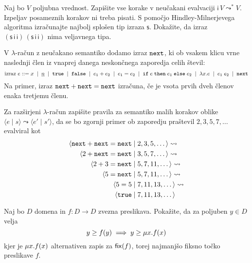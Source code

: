 \documentclass[arhiv]{../izpit}
\begin{document}
\podnaloga[\tocke{5}] Naj bo $V$ poljubna vrednost. Zapišite vse korake v neučakani evalvaciji $\mathsf{i} \, V \leadsto^* V$. Izpeljav posameznih korakov ni treba pisati.
\podnaloga[\tocke{10}] S pomočjo Hindley-Milnerjevega algoritma izračunajte najbolj splošen tip izraza $\mathsf{s}$.
\podnaloga[\tocke{5}] Dokažite, da izraz $(\mathsf{s} \, \mathsf{i} \, \mathsf{i}) \, (\mathsf{s} \, \mathsf{i} \, \mathsf{i})$ nima veljavnega tipa.

\nadaljevanje


\naloga[\tocke{20}]
V $\lambda$-račun z neučakano semantiko dodamo izraz $\mathtt{next}$, ki ob vsakem klicu vrne naslednji člen iz vnaprej danega neskončnega zaporedja celih števil:
\[
  \text{izraz $e$} \mathrel{{:}{:}{=}}
  x \;\mid\;
  \underline{n} \;\mid\;
  \mathtt{true} \;\mid\;
  \mathtt{false} \;\mid\;
  e_1 + e_2 \;\mid\;
  e_1 = e_2 \;\mid\;
  \mathtt{if}\;e\;\mathtt{then}\;e_1\;\mathtt{else}\;e_2 \;\mid\;
  \lambda x. e \;\mid\;
  e_1 \; e_2 \;\mid\;
  \mathtt{next}
\]
Na primer, izraz $\mathtt{next} + \mathtt{next} = \mathtt{next}$ izračuna, če je vsota prvih dveh členov enaka tretjemu členu.

Za razširjeni $\lambda$-račun zapišite pravila za semantiko malih korakov oblike $\langle e \mid s\rangle \leadsto \langle e' \mid s'\rangle$, da se bo zgornji primer ob zaporedju praštevil $2, 3, 5, 7, \dots$ evalviral kot
\begin{align*}
  \langle \mathtt{next} + \mathtt{next} = \mathtt{next} & \mid 2, 3, 5, \dots \rangle \leadsto   \\
  \langle 2 + \mathtt{next} = \mathtt{next}    & \mid 3, 5, 7, \dots \rangle \leadsto   \\
  \langle 2 + 3 = \mathtt{next}       & \mid 5, 7, 11, \dots \rangle \leadsto  \\
  \langle 5 = \mathtt{next}           & \mid 5, 7, 11, \dots \rangle \leadsto  \\
  \langle 5 = 5              & \mid 7, 11, 13, \dots \rangle \leadsto \\
  \langle \mathtt{true}               & \mid 7, 11, 13, \dots \rangle
\end{align*}
\nadaljevanje


\naloga[\tocke{20}]


\podnaloga[\tocke{5}]
Naj bo $D$ domena in $f : D \to D$ zvezna preslikava.
Pokažite, da za poljuben $y \in D$ velja
\[
  y \ge f(y) \implies y \ge \mu x. f(x)
\]
kjer je $\mu x. f(x)$ alternativen zapis za $\mathsf{fix}(f)$, torej najmanjšo fiksno točko preslikave $f$.
\end{document}
